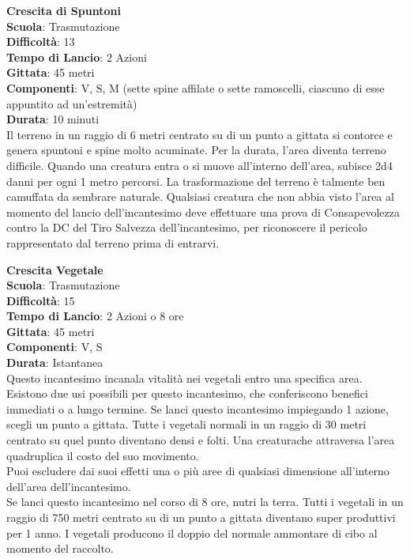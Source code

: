 \begin{multicols}{2}
\medskip\textbf{Crescita di Spuntoni}\\
\textbf{Scuola}: Trasmutazione\\
\textbf{Difficoltà}:  13\\
\textbf{Tempo di Lancio}: 2 Azioni\\
\textbf{Gittata}: 45 metri\\
\textbf{Componenti}: V, S, M (sette spine affilate o sette ramoscelli, ciascuno di esse appuntito ad un'estremità)\\
\textbf{Durata}: 10 minuti\\
Il terreno in un raggio di 6 metri centrato su di un punto a gittata si contorce e genera spuntoni e spine molto acuminate. Per la durata, l’area diventa terreno difficile. Quando una creatura entra o si muove all'interno dell'area, subisce 2d4 danni per ogni 1 metro percorsi.
La trasformazione del terreno è talmente ben camuffata da sembrare naturale. Qualsiasi creatura che non abbia visto l’area al momento del lancio dell'incantesimo deve effettuare una prova di Consapevolezza contro la DC del Tiro Salvezza dell'incantesimo, per riconoscere il pericolo rappresentato dal terreno prima di entrarvi. 

\medskip\textbf{Crescita Vegetale}\\
\textbf{Scuola}: Trasmutazione\\
\textbf{Difficoltà}:  15\\
\textbf{Tempo di Lancio}: 2 Azioni o 8 ore\\
\textbf{Gittata}: 45 metri\\
\textbf{Componenti}: V, S\\
\textbf{Durata}: Istantanea\\
Questo incantesimo incanala vitalità nei vegetali entro una specifica area. Esistono due usi possibili per questo incantesimo, che conferiscono benefici immediati o a lungo termine. Se lanci questo incantesimo impiegando 1 azione, scegli un punto a gittata. Tutte i vegetali normali in un  raggio di 30 metri centrato su quel punto diventano densi e folti. Una creaturache attraversa l’area quadruplica il costo del suo movimento.\\
Puoi escludere dai suoi effetti una o più aree di qualsiasi dimensione all'interno dell'area dell'incantesimo.\\
Se lanci questo incantesimo nel corso di 8 ore, nutri la terra. Tutti i vegetali in un raggio di 750 metri centrato su di un punto a gittata diventano super produttivi per 1 anno. I vegetali producono il doppio del normale ammontare di cibo al momento del raccolto.


\end{multicols}

